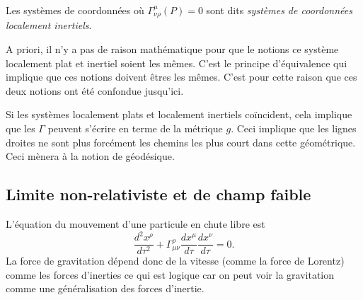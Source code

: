 \documentclass[a4paper,11pt]{report}
\begin{document}
            \begin{definition}
                Les systèmes de coordonnées où $\Gamma^\mu_{\nu\rho}(P) = 0$ sont dits \textit{systèmes de coordonnées localement inertiels}.
            \end{definition}
            
            \begin{rmk}
                A priori, il n'y a pas de raison mathématique pour que le notions ce système localement plat et inertiel soient les mêmes. C'est le principe d'équivalence qui implique que ces notions doivent êtres les mêmes. C'est pour cette raison que ces deux notions ont été confondue jusqu'ici.
            \end{rmk}
            
            Si les systèmes localement plats et localement inertiels coïncident, cela implique que les $\Gamma$ peuvent s'écrire en terme de la métrique $g$. Ceci implique que les lignes droites ne sont plus forcément les chemins les plus court dans cette géométrique. Ceci mènera à la notion de géodésique.
            
        \subsection{Limite non-relativiste et de champ faible}
            
            L'équation du mouvement d'une particule en chute libre est 
            \begin{equation}
                \frac{d^2x^\rho}{d\tau^2}+\Gamma^\rho_{\mu\nu}\frac{dx^\mu}{d\tau}\frac{dx^\nu}{d\tau} = 0.
            \end{equation}
            La force de gravitation dépend donc de la vitesse (comme la force de Lorentz) comme les forces d'inerties ce qui est logique car on peut voir la gravitation comme une généralisation des forces d'inertie.\\
            
\end{document}
